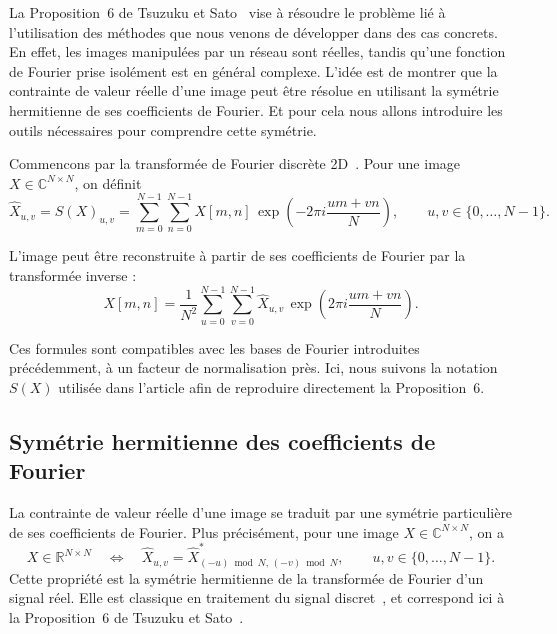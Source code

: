 La Proposition~6 de Tsuzuku et Sato~\cite{tsuzuku2019structural} vise à résoudre le problème lié à l'utilisation des 
méthodes que nous venons de développer dans des cas concrets. En effet, les images manipulées par un réseau sont réelles, 
tandis qu'une fonction de Fourier prise isolément est en général complexe. L'idée est de montrer que la contrainte de 
valeur réelle d'une image peut être résolue en utilisant la symétrie hermitienne de ses coefficients de Fourier. Et pour cela nous allons 
introduire les outils nécessaires pour comprendre cette symétrie.

Commencons par la transformée de Fourier discrète 2D~\cite{ImagerieNumeriqueTheme7Block2}. Pour une image
$X\in\mathbb{C}^{N\times N}$, on définit
\begin{equation*}
    \widehat{X}_{u,v}
    =
    S(X)_{u,v}
    =
    \sum_{m=0}^{N-1}\sum_{n=0}^{N-1}
    X[m,n]\,
    \exp\left(
        -2\pi i\frac{um+vn}{N}
    \right),
    \qquad
    u,v\in\{0,\dots,N-1\}.
\end{equation*}

L'image peut être reconstruite à partir de ses coefficients de Fourier par la transformée inverse :
\begin{equation}
    X[m,n]
    =
    \frac{1}{N^2}
    \sum_{u=0}^{N-1}\sum_{v=0}^{N-1}
    \widehat{X}_{u,v}\,
    \exp\left(
        2\pi i\frac{um+vn}{N}
    \right).
    \label{eq:idft2d_definition}
\end{equation}

Ces formules sont compatibles avec les bases de Fourier introduites précédemment, à un facteur de
normalisation près. Ici, nous suivons la notation $S(X)$ utilisée dans l'article \cite{tsuzuku2019structural} afin de reproduire
directement la Proposition~6.

\subsection{Symétrie hermitienne des coefficients de Fourier}

La contrainte de valeur réelle d'une image se traduit par une symétrie particulière de ses coefficients de
Fourier. Plus précisément, pour une image $X\in\mathbb{C}^{N\times N}$, on a
\begin{equation}
    X\in\mathbb{R}^{N\times N}
    \quad\Longleftrightarrow\quad
    \widehat{X}_{u,v}
    =
    \widehat{X}^{*}_{(-u)\bmod N,\,(-v)\bmod N},
    \qquad
    u,v\in\{0,\dots,N-1\}.
    \label{eq:symetrie_hermitienne_fourier}
\end{equation}
Cette propriété est la symétrie hermitienne de la transformée de Fourier d'un signal réel. Elle est
classique en traitement du signal discret~\cite{oppenheim2009discrete}, et correspond ici à la
Proposition~6 de Tsuzuku et Sato~\cite{tsuzuku2019structural}.

